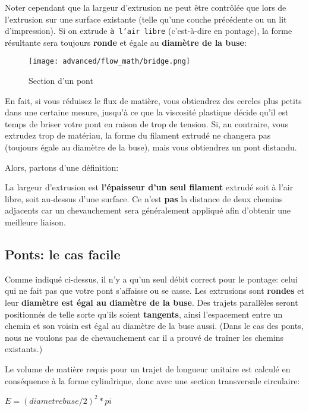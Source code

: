Noter cependant que la largeur d'extrusion ne peut être contrôl\'ee que lors de l'extrusion sur une surface existante (telle qu'une couche pr\'ec\'edente ou un lit d'impression). Si on extrude \texttt{\`a l'air libre} (c'est-\`a-dire en pontage), la forme r\'esultante sera toujours \textbf{ronde} et \'egale au \textbf{diam\`etre de la buse}:

\begin{figure}[H]
\centering
\texttt{[image: advanced/flow\_math/bridge.png]}
\caption{Section d'un pont}
\label{fig:bridge}
\end{figure}

En fait, si vous r\'eduisez le flux de mati\`ere, vous obtiendrez des cercles plus petits dans une certaine mesure, jusqu'\`a ce que la viscosit\'e plastique d\'ecide qu'il est temps de briser votre pont en raison de trop de tension. Si, au contraire, vous extrudez trop de mat\'eriau, la forme du filament extrud\'e ne changera pas (toujours \'egale au diam\`etre de la buse), mais vous obtiendrez un pont distandu.

Alors, partons d'une d\'efinition:

La largeur d'extrusion est \textbf{l'\'epaisseur d'un seul filament} extrud\'e soit \`a l'air libre, soit au-dessus d'une surface. Ce n'est \textbf{pas} la distance de deux chemins adjacents car un chevauchement sera g\'en\'eralement appliqu\'e afin d'obtenir une meilleure liaison.

\subsection{Ponts: le cas facile} %

Comme indiqu\'e ci-dessus, il n'y a qu'un seul d\'ebit correct pour le pontage: celui qui ne fait pas que votre pont s'affaisse ou se casse. Les extrusions sont \textbf{rondes} et leur \textbf{diam\`etre est \'egal au diam\`etre de la buse}. Des trajets parall\`eles seront positionn\'es de telle sorte qu'ils soient \textbf{tangents}, ainsi l'espacement entre un chemin et son voisin est \'egal au diam\`etre de la buse aussi. (Dans le cas des ponts, nous ne voulons pas de chevauchement car il a prouv\'e de tra\^iner les chemins existants.)

Le volume de mati\`ere requis pour un trajet de longueur unitaire est calcul\'e en cons\'equence \`a la forme cylindrique, donc avec une section transversale circulaire:

$E = (diametre buse/2)^2 * pi$

